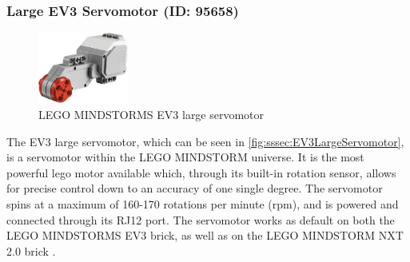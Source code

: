 \subsubsection{Large EV3 Servomotor (ID: 95658)}
\begin{figure}[H]
  \centering
  \includegraphics[width=3cm]{images/techAnalysis/LegoEV3LargeServomotor.jpg}
  \caption{LEGO MINDSTORMS EV3 large servomotor \cite{BrickOWl-figure-EV3-largeServo}}\label{fig:sssec:EV3LargeServomotor}
\end{figure}
The EV3 large servomotor, which can be seen in \autoref{fig:sssec:EV3LargeServomotor}, is a servomotor within the LEGO MINDSTORM universe.
It is the most powerful lego motor available which, through its built-in rotation sensor, allows for precise control down to an accuracy of one single degree.
The servomotor spins at a maximum of 160-170 rotations per minute (rpm), and is powered and connected through its RJ12 port.
The servomotor works as default on both the LEGO MINDSTORMS EV3 brick, as well as on the LEGO MINDSTORM NXT 2.0 brick \cite{lego_lego_EV3NXTCompatibility}. \cite{LEGO_mindstorms_2013-1}
